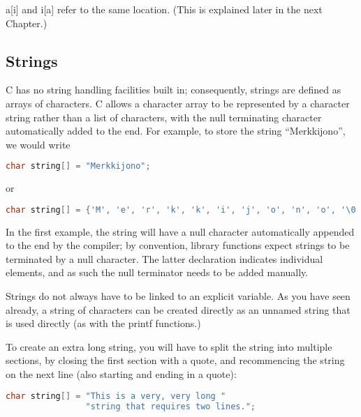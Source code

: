 a[i] and i[a] refer to the same location. (This is explained later in the next
Chapter.)

\subsection{Strings}
C has no string handling facilities built in; consequently, strings are defined
as arrays of characters. C allows a character array to be represented by a
character string rather than a list of characters, with the null terminating
character automatically added to the end. For example, to store the string
``Merkkijono'', we would write
\lstset{basicstyle=\scriptsize, numbers=left, captionpos=b, tabsize=4}
\begin{lstlisting}[caption=Section \thesection listing \arabic{arraycnt},language={C},
breaklines=true,xleftmargin=15pt,label=lst:section\thesection listing\arabic{arraycnt}]
char string[] = "Merkkijono";
\end{lstlisting}

or
\lstset{basicstyle=\scriptsize, numbers=left, captionpos=b, tabsize=4}
\begin{lstlisting}[caption=Section \thesection listing \arabic{arraycnt},language={C},
breaklines=true,xleftmargin=15pt,label=lst:section\thesection listing\arabic{arraycnt}]
char string[] = {'M', 'e', 'r', 'k', 'k', 'i', 'j', 'o', 'n', 'o', '\0'};
\end{lstlisting}

In the first example, the string will have a null character automatically
appended to the end by the compiler; by convention, library functions expect
strings to be terminated by a null character. The latter declaration indicates
individual elements, and as such the null terminator needs to be added
manually. 

Strings do not always have to be linked to an explicit variable. As you have
seen already, a string of characters can be created directly as an unnamed
string that is used directly (as with the printf functions.) 

To create an extra long string, you will have to split the string into multiple
sections, by closing the first section with a quote, and recommencing the
string on the next line (also starting and ending in a quote):
\lstset{basicstyle=\scriptsize, numbers=left, captionpos=b, tabsize=4}
\begin{lstlisting}[caption=Section \thesection listing \arabic{arraycnt},language={C},
breaklines=true,xleftmargin=15pt,label=lst:section\thesection listing\arabic{arraycnt}]
char string[] = "This is a very, very long "
                "string that requires two lines.";
\end{lstlisting}

